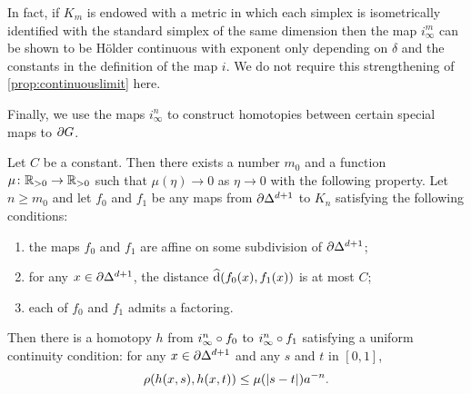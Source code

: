 \documentclass[a4paper]{article}
\begin{document}
\begin{remark}
  In fact, if $K_m$ is endowed with a metric in which each simplex is 
  isometrically identified with the standard simplex of the same dimension then 
  the map $i^m_\infty$ can be shown to be H\"{o}lder continuous with exponent 
  only depending on $\delta$ and the constants in the definition of the map $i$. 
  We do not require this strengthening of \cref{prop:continuouslimit} 
  here.
\end{remark}

Finally, we use the maps $i^n_\infty$ to construct homotopies between certain
special maps to $\partial G$.

\begin{proposition}\label{prop:basic_homotopies}
  Let $C$ be a constant. Then there exists a number $m_0$ and a function $\mu
  \colon \mathbb{R}_{>0}\to\mathbb{R}_{>0}$ such that $\mu(\eta)\to0$ as $\eta\to0$ with the following
  property. Let $n \geq m_0$ and let $f_0$ and $f_1$ be any maps from
  $\partial\Delta^{d+1}$ to $K_n$ satisfying the following conditions:
  \begin{enumerate}
    \item the maps $f_0$ and $f_1$ are affine on some subdivision of
      $\partial\Delta^{d+1}$;
    \item for any $x \in \partial\Delta^{d+1}$, the distance 
      $\operatorname{\widehat{d}}(f_0(x), f_1(x))$ is at most $C$;
    \item each of $f_0$ and $f_1$ admits a factoring.
  \end{enumerate}
  Then there is a homotopy $h$ from $i^n_\infty\circ f_0$ to
  $i^n_\infty\circ f_1$ satisfying a uniform continuity condition: for any
  $x \in \partial\Delta^{d+1}$ and any $s$ and $t$ in $[0,1]$,
  \begin{align*}
    \rho(h(x,s), h(x,t)) \leq \mu(\left|s-t\right|)a^{-n}.
  \end{align*}
\end{proposition}
\end{document}
